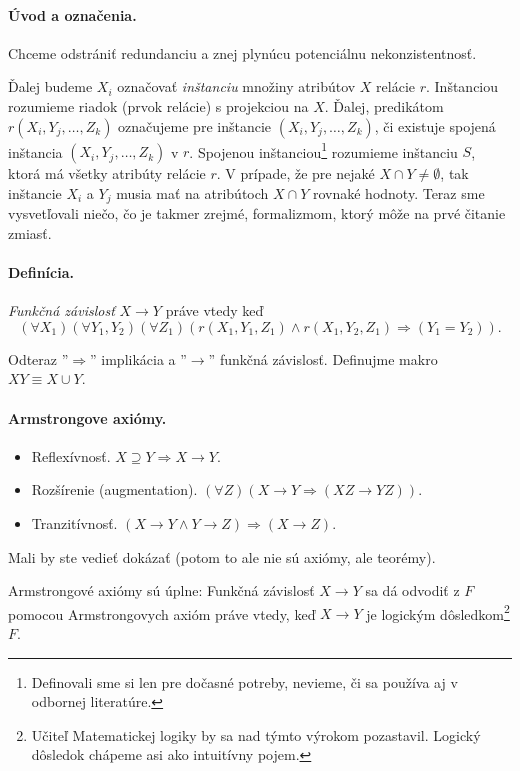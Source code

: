 \documentclass[10pt,a4paper]{article}
\begin{document}
\paragraph{Úvod a označenia.}
Chceme odstrániť redundanciu a znej plynúcu potenciálnu nekonzistentnosť. 

Ďalej budeme $X_i$ označovať \emph{inštanciu} množiny atribútov $X$ relácie $r$. 
Inštanciou rozumieme riadok (prvok relácie) s projekciou na $X$.
Ďalej, predikátom $r(X_i,Y_j, \ldots, Z_k)$ označujeme pre inštancie $(X_i,Y_j, \ldots, Z_k)$, či existuje spojená inštancia $(X_i,Y_j, \ldots, Z_k)$ v $r$.
Spojenou inštanciou\footnote{Definovali sme si len pre dočasné potreby, nevieme, či sa používa aj v odbornej literatúre.} 
rozumieme inštanciu $S$, ktorá má všetky atribúty relácie $r$. V prípade, že pre nejaké $X \cap Y \neq \emptyset$, tak inštancie $X_i$ a $Y_j$ musia mať na atribútoch $X \cap Y$ rovnaké hodnoty.  
Teraz sme vysvetľovali niečo, čo je takmer zrejmé, formalizmom, ktorý môže na prvé čitanie zmiasť. 

\paragraph{Definícia.}
\emph{Funkčná závislosť} $X \rightarrow Y$ práve vtedy keď 
$$(\forall X_1)(\forall Y_1,Y_2)(\forall Z_1) (r(X_1, Y_1, Z_1) \wedge r(X_1, Y_2, Z_1) \Rightarrow (Y_1 = Y_2)).$$

Odteraz ''$\Rightarrow$'' implikácia a ''$\rightarrow$'' funkčná závislosť.
Definujme makro $XY \equiv X \cup Y$. 

\paragraph{Armstrongove axiómy.} 
\begin{itemize}
\item Reflexívnosť. $X \supseteq Y \Rightarrow X \rightarrow Y$.
\item Rozšírenie (augmentation). $(\forall Z)(X \rightarrow Y \Rightarrow (XZ \rightarrow YZ))$.
\item Tranzitívnosť. $(X \rightarrow Y \wedge Y \rightarrow Z) \Rightarrow (X \rightarrow Z)$.
\end{itemize}
 
Mali by ste vedieť dokázať (potom to ale nie sú axiómy, ale teorémy). 
 
Armstrongové axiómy sú úplne: 
Funkčná závislosť $X \rightarrow Y$ sa dá odvodiť z $F$ pomocou
Armstrongovych axióm práve vtedy, keď $X \rightarrow Y$ je logickým
dôsledkom\footnote{Učiteľ Matematickej logiky by sa nad týmto výrokom pozastavil. Logický dôsledok chápeme asi ako intuitívny pojem.} $F$.
\end{document}

